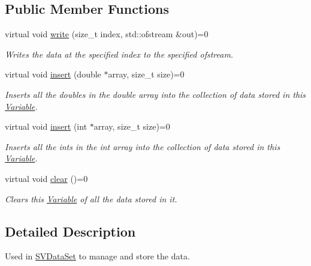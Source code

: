 \subsection*{Public Member Functions}
\begin{DoxyCompactItemize}
\item 
virtual void \hyperlink{classrepast_1_1_variable_aa72da48bdca530dd7878b912254568e0}{write} (size\-\_\-t index, std\-::ofstream \&out)=0
\begin{DoxyCompactList}\small\item\em Writes the data at the specified index to the specified ofstream. \end{DoxyCompactList}\item 
virtual void \hyperlink{classrepast_1_1_variable_ac87aada07f0b7ee34d6fbd2486016eb8}{insert} (double $\ast$array, size\-\_\-t size)=0
\begin{DoxyCompactList}\small\item\em Inserts all the doubles in the double array into the collection of data stored in this \hyperlink{classrepast_1_1_variable}{Variable}. \end{DoxyCompactList}\item 
virtual void \hyperlink{classrepast_1_1_variable_a5f625f2652dcbc9c1910539923475936}{insert} (int $\ast$array, size\-\_\-t size)=0
\begin{DoxyCompactList}\small\item\em Inserts all the ints in the int array into the collection of data stored in this \hyperlink{classrepast_1_1_variable}{Variable}. \end{DoxyCompactList}\item 
\hypertarget{classrepast_1_1_variable_a4440a6aeb8027c0f50cd4a5fd794c3de}{virtual void \hyperlink{classrepast_1_1_variable_a4440a6aeb8027c0f50cd4a5fd794c3de}{clear} ()=0}\label{classrepast_1_1_variable_a4440a6aeb8027c0f50cd4a5fd794c3de}

\begin{DoxyCompactList}\small\item\em Clears this \hyperlink{classrepast_1_1_variable}{Variable} of all the data stored in it. \end{DoxyCompactList}\end{DoxyCompactItemize}


\subsection{Detailed Description}
Used in \hyperlink{classrepast_1_1_s_v_data_set}{S\-V\-Data\-Set} to manage and store the data. 

